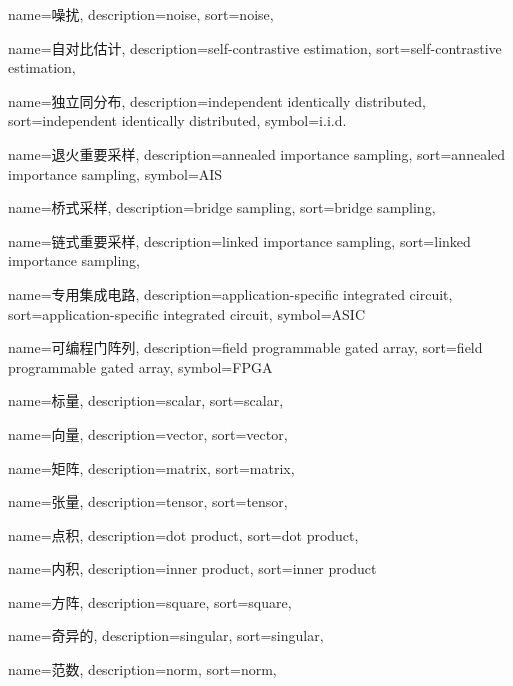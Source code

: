 {
  name=噪扰,
  description={noise},
  sort={noise},
}

{
  name=自对比估计,
  description={self-contrastive estimation},
  sort={self-contrastive estimation},
}

{
  name=独立同分布,
  description={independent identically distributed},
  sort={independent identically distributed},
  symbol={i.i.d.}
}

{
  name=退火重要采样,
  description={annealed importance sampling},
  sort={annealed importance sampling},
  symbol={AIS}
}

{
  name=桥式采样,
  description={bridge sampling},
  sort={bridge sampling},
}

{
  name=链式重要采样,
  description={linked importance sampling},
  sort={linked importance sampling},
}

{
  name=专用集成电路,
  description={application-specific integrated circuit},
  sort={application-specific integrated circuit},
  symbol={ASIC}
}

{
  name=可编程门阵列,
  description={field programmable gated array},
  sort={field programmable gated array},
  symbol={FPGA}
}

{
  name=标量,
  description={scalar},
  sort={scalar},
}

{
  name=向量,
  description={vector},
  sort={vector},
}

{
  name=矩阵,
  description={matrix},
  sort={matrix},
}

{
  name=张量,
  description={tensor},
  sort={tensor},
}

{
  name=点积,
  description={dot product},
  sort={dot product},
}

{
  name=内积,
  description={inner product},
  sort={inner product}
}

{
  name=方阵,
  description={square},
  sort={square},
}

{
  name=奇异的,
  description={singular},
  sort={singular},
}

{
  name=范数,
  description={norm},
  sort={norm},
}

